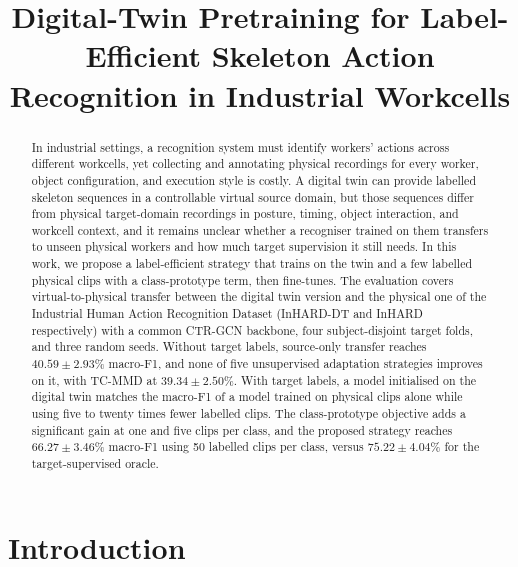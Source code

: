 \documentclass[Afour,sagev,times]{sagej}
\begin{document}

\title{Digital-Twin Pretraining for Label-Efficient Skeleton Action Recognition in Industrial Workcells}

\author{}

\begin{abstract}
  In industrial settings, a recognition system must identify workers' actions
  across different workcells, yet collecting and annotating physical recordings
  for every worker, object configuration, and execution style is costly. A
  digital twin can provide labelled skeleton sequences in a controllable virtual
  source domain, but those sequences differ from physical target-domain
  recordings in posture, timing, object interaction, and workcell context, and
  it remains unclear whether a recogniser trained on them transfers to unseen
  physical workers and how much target supervision it still needs. In this
  work, we propose a label-efficient strategy that trains on the twin and a few
  labelled physical clips with a class-prototype term, then fine-tunes. The
  evaluation covers virtual-to-physical transfer between the digital twin version and
  the     physical one of the Industrial Human Action Recognition Dataset (InHARD-DT and InHARD respectively) with a common CTR-GCN backbone, four
  subject-disjoint target folds, and three random seeds. Without target labels,
  source-only transfer reaches $40.59\pm2.93\%$ macro-F1, and none of five
  unsupervised adaptation strategies improves on it, with TC-MMD at
  $39.34\pm2.50\%$. With target labels, a model initialised
  on the digital twin matches the macro-F1 of a model trained on physical clips
  alone while using five to twenty times fewer labelled clips. The
  class-prototype objective adds a significant gain at one and five clips per
  class, and the proposed strategy reaches
  $66.27\pm3.46\%$ macro-F1 using 50 labelled clips per class, versus
  $75.22\pm4.04\%$ for the target-supervised oracle.
\end{abstract}


\maketitle

\section{Introduction}
\label{sec:introduction}
\end{document}
